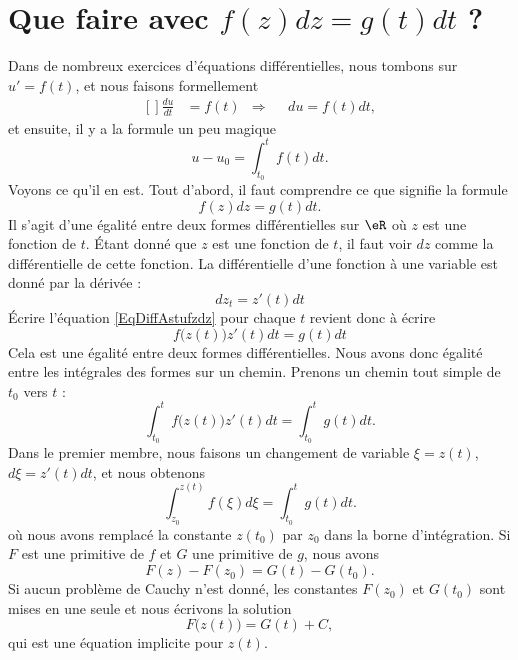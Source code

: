                     \section{Que faire avec \texorpdfstring{$f(z)dz=g(t)dt$}{fzdz} ?}
\label{SecFairedzdt}

Dans de nombreux exercices d'équations différentielles, nous tombons sur $u'=f(t)$, et nous faisons formellement
\begin{equation}
    \begin{aligned}[]
        \frac{ du }{ dt }&=f(t) &\Rightarrow    &&du=f(t)dt,
    \end{aligned}
\end{equation}
et ensuite, il y a la formule un peu magique
\begin{equation}
    u-u_0=\int_{t_0}^tf(t)dt.
\end{equation}
Voyons ce qu'il en est. Tout d'abord, il faut comprendre ce que signifie la formule
\begin{equation}        \label{EqDiffAstufzdz}
    f(z)dz=g(t)dt.
\end{equation}
Il s'agit d'une égalité entre deux formes différentielles sur $\eR$ où $z$ est une fonction de $t$.  Étant donné que $z$ est une fonction de $t$, il faut voir $dz$ comme la différentielle de cette fonction. La différentielle d'une fonction à une variable est donné par la dérivée :
\begin{equation}
    dz_t=z'(t)dt
\end{equation}
Écrire l'équation \eqref{EqDiffAstufzdz} pour chaque $t$ revient donc à écrire
\begin{equation}
    f\big( z(t) \big)z'(t)dt=g(t)dt
\end{equation}
Cela est une égalité entre deux formes différentielles. Nous avons donc égalité entre les intégrales des formes sur un chemin. Prenons un chemin tout simple de $t_0$ vers $t$ :
\begin{equation}
    \int_{t_0}^tf\big( z(t) \big)z'(t)dt=\int_{t_0}^tg(t)dt.
\end{equation}
Dans le premier membre, nous faisons un changement de variable $\xi=z(t)$, $d\xi=z'(t)dt$, et nous obtenons
\begin{equation}        \label{EqIntDiffAstuztz}
    \int_{z_0}^{z(t)}f(\xi)d\xi=\int_{t_0}^tg(t)dt.
\end{equation}
où nous avons remplacé la constante $z(t_0)$ par $z_0$ dans la borne d'intégration.  Si $F$ est une primitive de $f$ et $G$ une primitive de $g$, nous avons
\begin{equation}
    F(z)-F(z_0)=G(t)-G(t_0).
\end{equation}
Si aucun problème de Cauchy n'est donné, les constantes $F(z_0)$ et $G(t_0)$ sont mises en une seule et nous écrivons la solution
\begin{equation}
    F\big( z(t) \big)=G(t)+C,
\end{equation}
qui est une équation implicite pour $z(t)$. 

